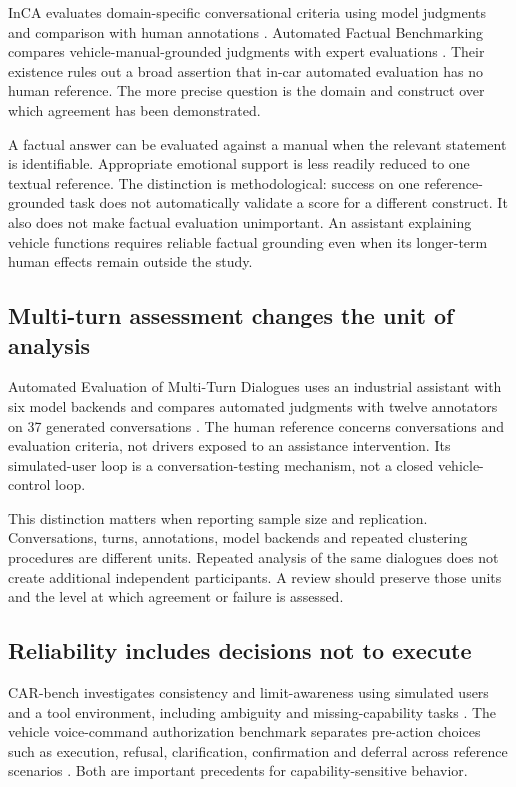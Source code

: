 \documentclass[11pt,a4paper]{article}
\begin{document}
InCA evaluates domain-specific conversational criteria using model
judgments and comparison with human annotations \citep{S14}. Automated
Factual Benchmarking compares vehicle-manual-grounded judgments with
expert evaluations \citep{S15}. Their existence rules out a broad
assertion that in-car automated evaluation has no human reference. The
more precise question is the domain and construct over which agreement
has been demonstrated.

A factual answer can be evaluated against a manual when the relevant
statement is identifiable. Appropriate emotional support is less readily
reduced to one textual reference. The distinction is methodological:
success on one reference-grounded task does not automatically validate a
score for a different construct. It also does not make factual
evaluation unimportant. An assistant explaining vehicle functions
requires reliable factual grounding even when its longer-term human
effects remain outside the study.

\subsection{Multi-turn assessment changes the unit of
analysis}\label{multi-turn-assessment-changes-the-unit-of-analysis}

Automated Evaluation of Multi-Turn Dialogues uses an industrial
assistant with six model backends and compares automated judgments with
twelve annotators on 37 generated conversations \citep{S16}. The human
reference concerns conversations and evaluation criteria, not drivers
exposed to an assistance intervention. Its simulated-user loop is a
conversation-testing mechanism, not a closed vehicle-control loop.

This distinction matters when reporting sample size and replication.
Conversations, turns, annotations, model backends and repeated
clustering procedures are different units. Repeated analysis of the same
dialogues does not create additional independent participants. A review
should preserve those units and the level at which agreement or failure
is assessed.

\subsection{Reliability includes decisions not to
execute}\label{reliability-includes-decisions-not-to-execute}

CAR-bench investigates consistency and limit-awareness using simulated
users and a tool environment, including ambiguity and missing-capability
tasks \citep{S17}. The vehicle voice-command authorization benchmark
separates pre-action choices such as execution, refusal, clarification,
confirmation and deferral across reference scenarios \citep{S18}. Both
are important precedents for capability-sensitive behavior.
\end{document}

